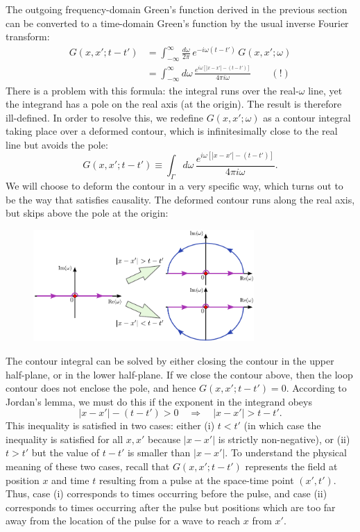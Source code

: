 \documentclass[10pt,a4paper]{article}
\begin{document}
The outgoing frequency-domain Green's function derived in the previous
section can be converted to a time-domain Green's function by the usual
inverse Fourier transform:
\begin{align*}
  G(x,x';t-t') &= \int_{-\infty}^\infty \frac{d\omega}{2\pi} \, e^{-i\omega (t-t')} \, G(x,x'; \omega) \\ &= \int_{-\infty}^\infty d\omega \, \frac{e^{i\omega \left[|x-x'| - (t-t')\right]}}{4\pi i\omega}\qquad (!)
\end{align*}
There is a problem with this formula: the integral runs over the
real-$\omega$ line, yet the integrand has a pole on the real axis (at
the origin). The result is therefore ill-defined. In order to resolve
this, we redefine $G(x,x';\omega)$ as a contour integral taking place
over a deformed contour, which is infinitesimally close to the real line
but avoids the pole:
\begin{equation}
G(x,x';t-t') \equiv \int_\Gamma d\omega \, \frac{e^{i\omega \left[|x-x'| - (t-t')\right]}}{4\pi i\omega}.
\end{equation}
We will choose to deform the contour in a very specific way, which
turns out to be the way that satisfies causality. The deformed contour
runs along the real axis, but skips above the pole at the origin:

\begin{figure}[h]
  \centering\includegraphics[width=0.75\textwidth]{causality_contour}
\end{figure}

The contour integral can be solved by either closing the contour in
the upper half-plane, or in the lower half-plane. If we close the
contour above, then the loop contour does not enclose the pole, and
hence $G(x,x';t-t') = 0$. According to Jordan's lemma, we must do this
if the exponent in the integrand obeys
\begin{equation}
|x-x'| - (t-t') > 0  \quad \Rightarrow \quad |x-x'| > t-t'.
\end{equation}
This inequality is satisfied in two cases: either (i) $t < t'$ (in
which case the inequality is satisfied for all $x,x'$ because
$|x-x'|$ is strictly non-negative), or (ii) $t > t'$ but the value
of $t-t'$ is smaller than $|x-x'|$. To understand the physical
meaning of these two cases, recall that $G(x,x';t-t')$ represents the
field at position $x$ and time $t$ resulting from a pulse at the
space-time point $(x',t')$. Thus, case (i) corresponds to times
occurring before the pulse, and case (ii) corresponds to times occurring
after the pulse but positions which are too far away from the location
of the pulse for a wave to reach $x$ from $x'$.
\end{document}
